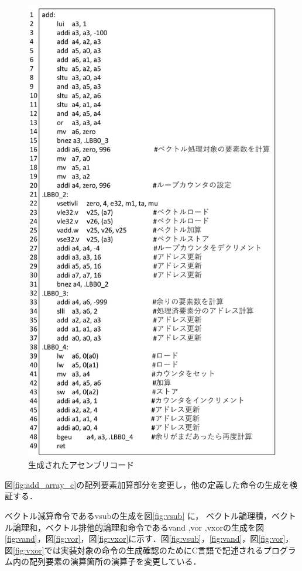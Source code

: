 \begin{figure}
    \centering
    \includegraphics[scale=0.55]{image/rv_vectorized_assembly.pdf}
    \caption{生成されたアセンブリコード}
    \label{fig:rv_vectorized_assembly}
\end{figure}

図\ref{fig:add_array_c}の配列要素加算部分を変更し，他の定義した命令の生成を検証する．

ベクトル減算命令であるvsubの生成を図\ref{fig:vsub}
に，
ベクトル論理積，ベクトル論理和，ベクトル排他的論理和命令であるvand ,vor ,vxorの生成を図\ref{fig:vand}，図\ref{fig:vor}，図\ref{fig:vxor}に示す．図\ref{fig:vsub}，\ref{fig:vand}，図\ref{fig:vor}，図\ref{fig:vxor}では実装対象の命令の生成確認のためにC言語で記述されるプログラム内の配列要素の演算箇所の演算子を変更している．


